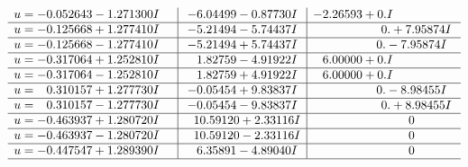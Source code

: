 \documentclass[1p]{elsarticle_modified}
\theoremstyle{definition}
\begin{document}
$$\begin{array}{c|c|c}
\begin{aligned}
u &= -0.052643 - 1.271300 I\end{aligned}
 & -6.04499 - 0.87730 I & -2.26593 + 0. I\phantom{ +0.000000I} \\ \hline\begin{aligned}
u &= -0.125668 + 1.277410 I\end{aligned}
 & -5.21494 - 5.74437 I & \phantom{-0.000000 -}0. + 7.95874 I \\ \hline\begin{aligned}
u &= -0.125668 - 1.277410 I\end{aligned}
 & -5.21494 + 5.74437 I & \phantom{-0.000000 } 0. - 7.95874 I \\ \hline\begin{aligned}
u &= -0.317064 + 1.252810 I\end{aligned}
 & \phantom{-}1.82759 - 4.91922 I & \phantom{-}6.00000 + 0. I\phantom{ +0.000000I} \\ \hline\begin{aligned}
u &= -0.317064 - 1.252810 I\end{aligned}
 & \phantom{-}1.82759 + 4.91922 I & \phantom{-}6.00000 + 0. I\phantom{ +0.000000I} \\ \hline\begin{aligned}
u &= \phantom{-}0.310157 + 1.277730 I\end{aligned}
 & -0.05454 + 9.83837 I & \phantom{-0.000000 } 0. - 8.98455 I \\ \hline\begin{aligned}
u &= \phantom{-}0.310157 - 1.277730 I\end{aligned}
 & -0.05454 - 9.83837 I & \phantom{-0.000000 -}0. + 8.98455 I \\ \hline\begin{aligned}
u &= -0.463937 + 1.280720 I\end{aligned}
 & \phantom{-}10.59120 + 2.33116 I & \phantom{-0.000000 } 0 \\ \hline\begin{aligned}
u &= -0.463937 - 1.280720 I\end{aligned}
 & \phantom{-}10.59120 - 2.33116 I & \phantom{-0.000000 } 0 \\ \hline\begin{aligned}
u &= -0.447547 + 1.289390 I\end{aligned}
 & \phantom{-}6.35891 - 4.89040 I & \phantom{-0.000000 } 0\\
 \hline 
 \end{array}$$\newpage$$\begin{array}{c|c|c}  

\end{array}$$
\end{document}
